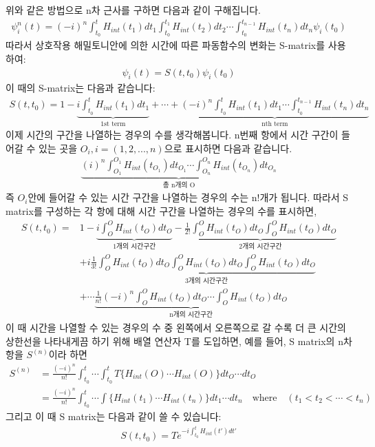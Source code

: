 \documentclass{article}
\begin{document}
위와 같은 방법으로 n차 근사를 구하면 다음과 같이 구해집니다.
\begin{align}
   \psi^n_i(t) = (-i)^n \int^t_{t_0}H_{int}(t_1)dt_1\int^{t_1}_{t_0}H_{int}(t_2)dt_2\cdots \int^{t_{n-1}}_{t_0}H_{int}(t_n)dt_n\psi_i(t_0)
\end{align}
따라서 상호작용 해밀토니안에 의한 시간에 따른 파동함수의 변화는 S-matrix를 사용하여:
\begin{align}
   \psi_i(t) = S(t,t_0)\psi_i(t_0)
\end{align}
이 때의 S-matrix는 다음과 같습니다:
\begin{align}
   S(t,t_0)=1-\underbrace{i\int^t_{t_0}H_{int}(t_1)dt_1}_\text{1st term} + \cdots + \underbrace{(-i)^n \int^t_{t_0}H_{int}(t_1)dt_1\cdots\int^{t_{n-1}}_{t_0}H_{int}(t_n)dt_n}_\text{nth term}
\end{align}
이제 시간의 구간을 나열하는 경우의 수를 생각해봅니다. n번째 항에서 시간 구간이 들어갈 수 있는 곳을 $O_i, i=(1,2,...,n)$으로 표시하면 다음과 같습니다.
\begin{align}
   \underbrace{(i)^n \int_{O_1}^{O_1} H_{int}(t_{O_1})dt_{O_1} \cdots \int_{O_n}^{O_n} H_{int}(t_{O_n})dt_{O_n} }_\text{총 n개의 O}
\end{align}
즉 $O_i$안에 들어갈 수 있는 시간 구간을 나열하는 경우의 수는 n!개가 됩니다. 따라서 S matrix를 구성하는 각 항에 대해 시간 구간을 나열하는 경우의 수를 표시하면,
\begin{align}
   S(t,t_0) =& 1 - \underbrace{i\int_{O}^{O} H_{int}(t_O)dt_O}_\text{1개의 시간구간} -\underbrace{\frac{1}{2!}\int_{O}^{O} H_{int}(t_O)dt_O\int_{O}^{O} H_{int}(t_O)dt_O}_\text{2개의 시간구간} \\
   & + i\frac{1}{3!}\underbrace{\int_{O}^{O} H_{int}(t_O)dt_O\int_{O}^{O} H_{int}(t_O)dt_O\int_{O}^{O} H_{int}(t_O)dt_O}_\text{3개의 시간구간} \\
   & + \cdots \underbrace{\frac{1}{n!}(-i)^n\int_{O}^{O} H_{int}(t_O)dt_O\cdots\int_{O}^{O} H_{int}(t_O)dt_O}_\text{n개의 시간구간}
\end{align}
이 때 시간을 나열할 수 있는 경우의 수 중 왼쪽에서 오른쪽으로 갈 수록 더 큰 시간의 상한선을 나타내게끔 하기 위해 배열 연산자 T를 도입하면, 예를 들어, S matrix의 n차 항을 $S^{(n)}$이라 하면
\begin{align}
   S^{(n)} &=\frac{(-i)^n}{n!}\int^{t}_{t_0}\cdots\int^t_{t_0}T\{H_{int}(O)\cdots H_{int}(O)\} dt_O \cdots dt_O \\
      &= \frac{(-i)^n}{n!}\int^{t}_{t_0}\cdots\int\{H_{int}(t_1)\cdots H_{int}(t_n)\} dt_1 \cdots dt_n \quad \text{where} \quad (t_1<t_2<\cdots <t_n)
\end{align}
그리고 이 때 S matrix는 다음과 같이 쓸 수 있습니다:
\begin{align}
   S(t,t_0)=T e^{-i\int_{t_0}^{t}H_{int}(t')dt'}
\end{align}
\end{document}
